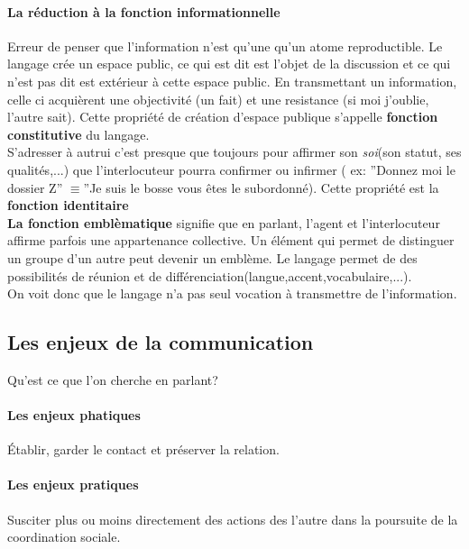 \documentclass[11pt]{article} %
\begin{document}
		 \paragraph{La réduction à la fonction informationnelle}
		 Erreur de penser que l'information n'est qu'une qu'un atome reproductible. Le langage crée un espace
		 public,  ce qui est dit est l'objet de la discussion et ce qui n'est pas dit est extérieur à cette espace 
		 public. En transmettant un information, celle ci acquièrent une objectivité (un fait) et une resistance 
		 (si moi j'oublie, l'autre sait). Cette propriété de création d'espace publique s'appelle \textbf{fonction
		 constitutive} du langage.\\
		 S'adresser à autrui c'est presque que toujours pour affirmer son \textit{soi}(son statut, ses 
		 qualités,...) que l'interlocuteur pourra confirmer ou infirmer ( ex: ''Donnez moi le dossier Z'' 
		 $\equiv$''Je suis le bosse vous êtes le subordonné). Cette propriété est la \textbf{fonction 
		 identitaire}\\
		 \textbf{La fonction emblèmatique} signifie que en parlant, l'agent et l'interlocuteur affirme parfois
		 une appartenance collective. Un élément qui permet de distinguer un groupe d'un autre peut devenir
		 un emblème. Le langage permet de des possibilités de réunion et de 
		 différenciation(langue,accent,vocabulaire,...).
		 \\On voit donc que le langage n'a pas seul vocation à transmettre de l'information.
	\subsection{Les enjeux de la communication}
		Qu'est ce que l'on cherche en parlant?
		\paragraph{Les  enjeux phatiques} Établir, garder le contact et préserver la relation.
		\paragraph{Les enjeux pratiques} Susciter plus ou moins directement des actions des l'autre dans
		la poursuite de la coordination sociale.
\end{document}
